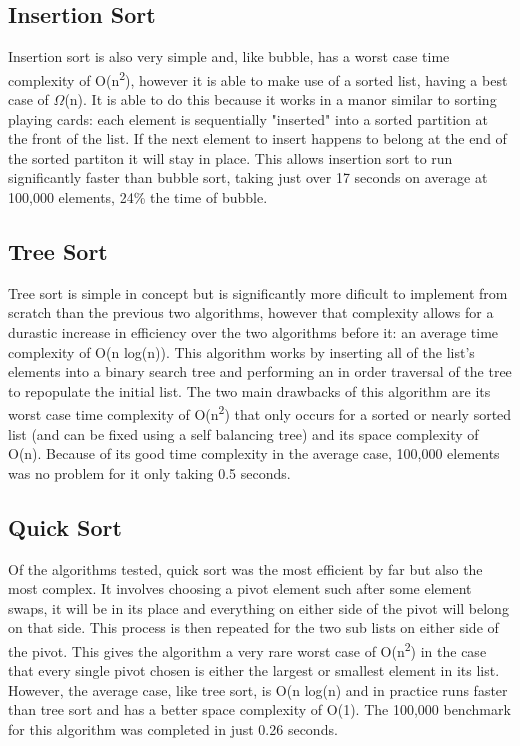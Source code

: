 \documentclass[conference]{IEEEtran}
\begin{document}
\subsection{Insertion Sort}
Insertion sort is also very simple and, like bubble, has a worst case time complexity of O(n\textsuperscript{2}), however it is able to make use of a sorted list, having a best case of $\Omega$(n). It is able to do this because it works in a manor similar to sorting playing cards: each element is sequentially "inserted" into a sorted partition at the front of the list. If the next element to insert happens to belong at the end of the sorted partiton it will stay in place. This allows insertion sort to run significantly faster than bubble sort, taking just over 17 seconds on average at 100,000 elements, 24\% the time of bubble.

\subsection{Tree Sort}
Tree sort is simple in concept but is significantly more dificult to implement from scratch than the previous two algorithms, however that complexity allows for a durastic increase in efficiency over the two algorithms before it: an average time complexity of O(n log(n)). This algorithm works by inserting all of the list's elements into a binary search tree and performing an in order traversal of the tree to repopulate the initial list. The two main drawbacks of this algorithm are its worst case time complexity of O(n\textsuperscript{2}) that only occurs for a sorted or nearly sorted list (and can be fixed using a self balancing tree) and its space complexity of O(n). Because of its good time complexity in the average case, 100,000 elements was no problem for it only taking 0.5 seconds.

\subsection{Quick Sort}
Of the algorithms tested, quick sort was the most efficient by far but also the most complex. It involves choosing a pivot element such after some element swaps, it will be in its place and everything on either side of the pivot will belong on that side. This process is then repeated for the two sub lists on either side of the pivot. This gives the algorithm a very rare worst case of O(n\textsuperscript{2}) in the case that every single pivot chosen is either the largest or smallest element in its list. However, the average case, like tree sort, is O(n log(n) and in practice runs faster than tree sort and has a better space complexity of O(1). The 100,000 benchmark for this algorithm was completed in just 0.26 seconds.
\end{document}
